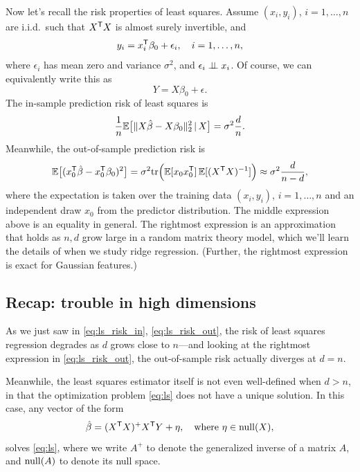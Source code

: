 \documentclass{article}
\begin{document}
Now let's recall the risk properties of least squares. Assume $(x_i,y_i)$,
$i=1,\dots,n$ are i.i.d.\ such that $X^{\mathsf{T}} X$ is almost surely invertible, and 
\[
y_i = x_i^{\mathsf{T}} \beta_0 + \epsilon_i, \quad i=1,\dots,n,
\]
where $\epsilon_i$ has mean zero and variance $\sigma^2$, and $\epsilon_i \perp\!\!\!\perp
x_i$. Of course, we can equivalently write this as 
\begin{equation}
\label{eq:model}
Y = X\beta_0 + \epsilon.
\end{equation}
The in-sample prediction risk of least squares is
\begin{equation}
\label{eq:ls_risk_in}
\frac{1}{n} \mathbb{E} \big[ \| X\hat{\beta} - X\beta_0 \|_2^2 \,|\, X \big] = \sigma^2
\frac{d}{n}.  
\end{equation}
Meanwhile, the out-of-sample prediction risk is
\begin{equation}
\label{eq:ls_risk_out}
\mathbb{E} \big[ (x_0^{\mathsf{T}}\hat{\beta} - x_0^{\mathsf{T}}\beta_0 )^2 \big] = \sigma^2 \mathrm{tr}\Big(\mathbb{E} [x_0
x_0^{\mathsf{T}}] \, \mathbb{E} [(X^{\mathsf{T}} X)^{-1}] \Big) \approx \sigma^2 \frac{d}{n-d},
\end{equation}
where the expectation is taken over the training data $(x_i,y_i)$, $i=1,\dots,n$
and an independent draw $x_0$ from the predictor distribution.  The middle 
expression above is an equality in general. The rightmost expression is an
approximation that holds as $n,d$ grow large in a random matrix theory model,
which we'll learn the details of when we study ridge regression. (Further, the
rightmost expression is exact for Gaussian features.)

\subsection{Recap: trouble in high dimensions}

As we just saw in \eqref{eq:ls_risk_in}, \eqref{eq:ls_risk_out}, the risk of
least squares regression degrades as $d$ grows close to $n$---and looking at the
rightmost expression in \eqref{eq:ls_risk_out}, the out-of-sample risk actually
diverges at $d=n$.

Meanwhile, the least squares estimator itself is not even well-defined when $d >
n$, in that the optimization problem \eqref{eq:ls} does not have a unique
solution. In this case, any vector of the form 
\begin{equation}
\label{eq:ls_eta}
\hat{\beta} = (X^{\mathsf{T}} X)^+ X^{\mathsf{T}} Y + \eta, \quad \text{where $\eta \in \mathrm{null}(X)$},
\end{equation}
solves \eqref{eq:ls}, where we write $A^+$ to denote the generalized inverse of
a matrix $A$, and $\mathrm{null}(A)$ to denote its null space.
\end{document}
